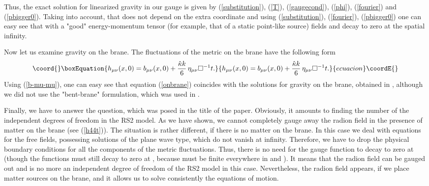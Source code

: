 \documentclass[a4paper,12pt]{article}
\begin{document}
Thus, the exact solution for linearized gravity in our gauge is given by
(\ref{substitution}), (\ref{T}), (\ref{gaugecond}), (\ref{phi}),
(\ref{fourier}) and (\ref{pbigger0}). Taking into account, that \myHighlight{$\phi$}\coordHE{} does
not depend on the extra coordinate \coordHE{} and using (\ref{substitution}),
(\ref{fourier}), (\ref{pbigger0}) one can easy see that with a "good"
energy-momentum tensor \coordHE{} (for example, that of a static
point-like source) fields \coordHE{} and \coordHE{} decay to zero
at the spatial infinity.

Now let us examine gravity on  the brane. The fluctuations of the
metric on the brane have the following form
\begin{equation}\coord{}\boxEquation{\label{onbrane}
h_{\mu\nu}(x,0)=b_{\mu\nu}(x,0)+\frac{\hat \kappa
k}{6}\,\eta_{\mu\nu}\Box^{-1}t.
}{h_{\mu\nu}(x,0)=b_{\mu\nu}(x,0)+\frac{\hat \kappa
k}{6}\,\eta_{\mu\nu}\Box^{-1}t.
}{ecuacion}\coordE{}\end{equation}
Using (\ref{b-mu-mu}), one can easy see that equation (\ref{onbrane})
coincides with the solutions for gravity on the brane, obtained in
\cite{GarTan,RKatz,AIMVV,Kakushadze}, although we did not use the
"bent-brane" formulation, which was used in \cite{GarTan,RKatz}.

Finally, we have to answer the question, which was posed in the
title of the paper. Obviously, it amounts to finding the number of
the independent degrees of freedom in the RS2 model. As we have
shown, we cannot completely gauge away the radion field in the
presence of  matter on the brane (see (\ref{h44t})). The situation
is rather different, if there is no matter on the brane. In this
case we deal with  equations for the free fields, possessing
solutions  of the plane wave type, which do not vanish at
infinity. Therefore, we have to drop the physical boundary
conditions for all the components of the metric fluctuations.
Thus, there is  no need for the gauge function \coordHE{} to decay to
zero at \coordHE{} (though the functions \myHighlight{$\xi_{\mu}$}\coordHE{} must
still decay to zero at \coordHE{}, because  \coordHE{} must be
finite everywhere in \coordHE{} and
\coordHE{}). It means that the
radion field can be gauged out  and is no more  an independent
degree of freedom of the RS2 model in this case. Nevertheless, the
radion field appears, if we place matter  sources on the brane,
and it allows us to solve consistently the equations of motion.
\end{document}
